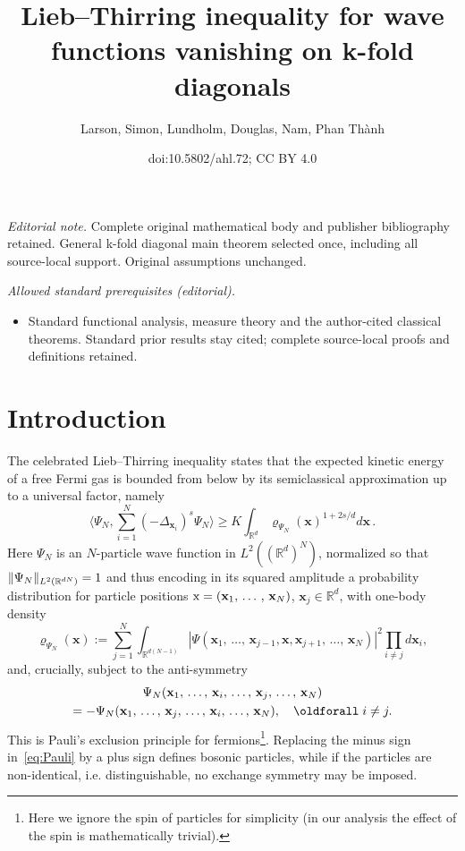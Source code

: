 \documentclass[10pt]{amsart}
\title{Lieb–Thirring inequality for wave functions vanishing on k-fold diagonals}
\author{Larson, Simon, Lundholm, Douglas, Nam, Phan Thành}
\date{doi:10.5802/ahl.72; CC BY 4.0}
\theoremstyle{definition}\newtheorem{defi}[theo]{Definition}\newtheorem{rema}[theo]{Remark}\newtheorem{exam}[theo]{Example}\newtheorem{exem}[theo]{Example}\newtheorem{nota}[theo]{Notation}
\newcommand*\R {\mathbb{R}}
\newcommand\1{{\ensuremath {\mathds 1} }}
\newcommand{\bx}{\mathbf{x}}
\newcommand{\sx}{\textup{x}}
\renewcommand*{\forall}{\mathrel{\oldforall}}
\begin{document}
\maketitle
\noindent\textit{Editorial note.} Complete original mathematical body and publisher bibliography retained. General k-fold diagonal main theorem selected once, including all source-local support. Original assumptions unchanged.\par\medskip
\noindent\textit{Allowed standard prerequisites (editorial).}\begin{itemize}
\item Standard functional analysis, measure theory and the author-cited classical theorems. Standard prior results stay cited; complete source-local proofs and definitions retained.
\end{itemize}\medskip

\section{Introduction}

The celebrated Lieb--Thirring inequality states that the expected kinetic energy of a free Fermi gas is bounded from below by its semiclassical approximation up to a universal factor, namely
\begin{equation}\label{eq:LT}
\biggl\langle \Psi_N, \sum_{i=1}^N (-\Delta_{\bx_i})^s \Psi_N\biggr\rangle
\ge K \int_{\R^d} \varrho_{\Psi_N}(\bx)^{1+2s/d} d\bx\,.
\end{equation}
Here $\Psi_N$ is an $N$-particle wave function in $L^2((\R^d)^N)$, normalized so that $\|\Psi_N\|_{L^2(\R^{dN})}\linebreak=1$ and thus encoding in its squared amplitude a probability distribution for particle positions $\sx = (\bx_1,\,\ldots\,,\,\bx_N)$, $\bx_j \in \R^d$, with one-body density
\[
\varrho_{\Psi_N}(\bx) := \sum_{j=1}^N \int_{\R^{d(N-1)}} \left|\Psi(\bx_1,\,\dots,\,\bx_{j-1},\bx,\bx_{j+1},\,\dots,\,\bx_N)\right|^2 \prod\limits_{i\ne j} d\bx_i,
\]
and, crucially, subject to the anti-symmetry
\begin{multline}\label{eq:Pauli}
\Psi_N(\bx_1,\,\ldots,\,\bx_i,\,\ldots,\,\bx_j,\,\ldots,\,\bx_N)\\
= - \Psi_N(\bx_1,\,\ldots,\,\bx_j,\,\ldots,\,\bx_i,\,\ldots,\,\bx_N), \quad \forall i\ne j.
\end{multline}
This is Pauli's exclusion principle for fermions\footnote{ Here we ignore the spin of particles for simplicity (in our analysis the effect of the spin is mathematically trivial).}. Replacing the minus sign in~\eqref{eq:Pauli} by a plus sign defines bosonic particles, while if the particles are non-identical, i.e. distinguishable, no exchange symmetry may be imposed.
\end{document}
